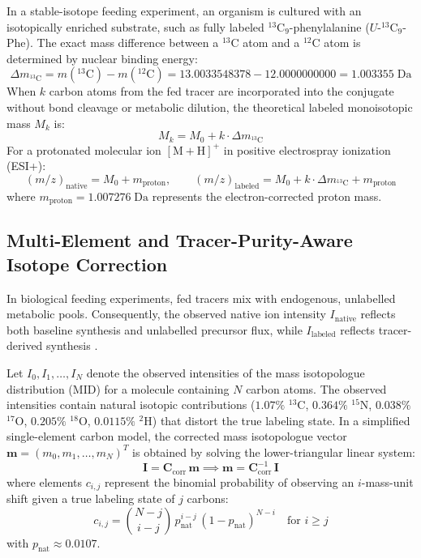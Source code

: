 \documentclass[11pt,twoside,openright]{book}
\begin{document}
In a stable-isotope feeding experiment, an organism is cultured with an isotopically enriched substrate, such as fully labeled $^{13}\text{C}_9$-phenylalanine ($U\text{-}^{13}\text{C}_9$-Phe). The exact mass difference between a $^{13}\text{C}$ atom and a $^{12}\text{C}$ atom is determined by nuclear binding energy:
\begin{equation}
\Delta m_{^{13}\text{C}} = m(^{13}\text{C}) - m(^{12}\text{C}) = 13.0033548378 - 12.0000000000 = 1.003355\;\text{Da}
\label{eq:carbon13_diff}
\end{equation}
When $k$ carbon atoms from the fed tracer are incorporated into the conjugate without bond cleavage or metabolic dilution, the theoretical labeled monoisotopic mass $M_k$ is:
\begin{equation}
M_k = M_0 + k \cdot \Delta m_{^{13}\text{C}}
\end{equation}
For a protonated molecular ion $[\text{M}+\text{H}]^+$ in positive electrospray ionization (ESI+):
\begin{equation}
(m/z)_{\text{native}} = M_0 + m_{\text{proton}}, \qquad (m/z)_{\text{labeled}} = M_0 + k \cdot \Delta m_{^{13}\text{C}} + m_{\text{proton}}
\end{equation}
where $m_{\text{proton}} = 1.007276\;\text{Da}$ represents the electron-corrected proton mass.

\subsection{Multi-Element and Tracer-Purity-Aware Isotope Correction}

In biological feeding experiments, fed tracers mix with endogenous, unlabelled metabolic pools. Consequently, the observed native ion intensity $I_{\text{native}}$ reflects both baseline synthesis and unlabelled precursor flux, while $I_{\text{labeled}}$ reflects tracer-derived synthesis \cite{buescher2015roadmap}.

Let $I_0, I_1, \dots, I_N$ denote the observed intensities of the mass isotopologue distribution (MID) for a molecule containing $N$ carbon atoms. The observed intensities contain natural isotopic contributions ($1.07\%$ $^{13}\text{C}$, $0.364\%$ $^{15}\text{N}$, $0.038\%$ $^{17}\text{O}$, $0.205\%$ $^{18}\text{O}$, $0.0115\%$ $^{2}\text{H}$) that distort the true labeling state. In a simplified single-element carbon model, the corrected mass isotopologue vector $\mathbf{m} = (m_0, m_1, \dots, m_N)^T$ is obtained by solving the lower-triangular linear system:
\begin{equation}
\mathbf{I} = \mathbf{C}_{\text{corr}} \, \mathbf{m} \implies \mathbf{m} = \mathbf{C}_{\text{corr}}^{-1} \, \mathbf{I}
\label{eq:mid_correction}
\end{equation}
where elements $c_{i, j}$ represent the binomial probability of observing an $i$-mass-unit shift given a true labeling state of $j$ carbons:
\begin{equation}
c_{i, j} = \binom{N - j}{i - j} \, p_{\text{nat}}^{i - j} \, (1 - p_{\text{nat}})^{N - i} \quad \text{for } i \ge j
\label{eq:binomial_matrix}
\end{equation}
with $p_{\text{nat}} \approx 0.0107$.
\end{document}

